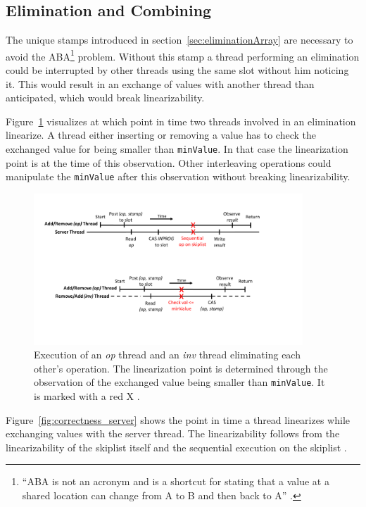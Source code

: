\subsection{Elimination and Combining}

The unique stamps introduced in section~\ref{sec:eliminationArray} are necessary to avoid the ABA\footnote{\enquote{ABA is not an acronym and is a shortcut for stating that a value at a shared location can change from A to B and then back to A} \cite[185]{dechev_understanding_2010}.} problem. Without this stamp a thread performing an elimination could be interrupted by other threads using the same slot without him noticing it. This would result in an exchange of values with another thread than anticipated, which would break linearizability.

Figure~\ref{fig:correctness_elim} visualizes at which point in time two threads involved in an elimination linearize. A thread either inserting or removing a value has to check the exchanged value for being smaller than \texttt{minValue}. In that case the linearization point is at the time of this observation. Other interleaving operations could manipulate the \texttt{minValue} after this observation without breaking linearizability.

\begin{figure}
	\centering
	\includegraphics[width=0.9\textwidth]{graphics/correctness2.pdf}
	\caption{Execution of an \emph{op} thread and an \emph{inv} thread eliminating each other's operation. The linearization point is determined through the observation of the exchanged value being smaller than \texttt{minValue}. It is marked with a red X \cite{calciu_adaptive_2014}.}
	\label{fig:correctness_elim}
\end{figure}

Figure~\ref{fig:correctness_server} shows the point in time a thread linearizes while exchanging values with the server thread. The linearizability follows from the linearizability of the skiplist itself and the sequential execution on the skiplist \cite{calciu_adaptive_2014}. 

